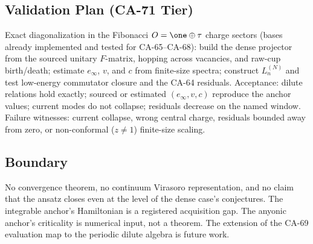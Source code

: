 \subsection{Validation Plan (CA-71 Tier)}

Exact diagonalization in the Fibonacci \(O=\one\oplus\tau\) charge sectors
(bases already implemented and tested for CA-65--CA-68): build the dense
projector from the sourced unitary \(F\)-matrix, hopping across vacancies,
and raw-cup birth/death; estimate \(e_\infty\), \(v\), and \(c\) from
finite-size spectra; construct \(L_n^{(N)}\) and test low-energy commutator
closure and the CA-64 residuals.  Acceptance: dilute relations hold exactly;
sourced or estimated \((e_\infty,v,c)\) reproduce the anchor values; current
modes do not collapse; residuals decrease on the named window.  Failure
witnesses: current collapse, wrong central charge, residuals bounded away
from zero, or non-conformal (\(z\neq1\)) finite-size scaling.

\subsection{Boundary}

No convergence theorem, no continuum Virasoro representation, and no claim
that the ansatz closes even at the level of the dense case's conjectures.
The integrable anchor's Hamiltonian is a registered acquisition gap.  The
anyonic anchor's criticality is numerical input, not a theorem.  The
extension of the CA-69 evaluation map to the periodic dilute algebra is
future work.

